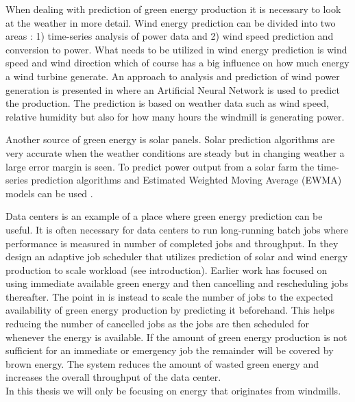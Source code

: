 When dealing with prediction of green energy production it is necessary to look at the weather in more detail. Wind energy prediction can be divided into two areas \cite{5}: 1) time-series analysis of power data and 2) wind speed prediction and conversion to power. What needs to be utilized in wind energy prediction is wind speed and wind direction which of course has a big influence on how much energy a wind turbine generate. An approach to analysis and prediction of wind power generation is presented in \cite{WindPowerGenerationUsingANN} where an Artificial Neural Network is used to predict the production. The prediction is based on weather data such as wind speed, relative humidity but also for how many hours the windmill is generating power.

Another source of green energy is solar panels. Solar
prediction algorithms are very accurate when the weather conditions are steady but in changing weather a large error margin is seen. To predict power output from a solar farm the time-series prediction algorithms and Estimated Weighted Moving Average (EWMA) models can be used \cite{5}.

Data centers is an example of a place where green energy prediction can be useful. It is often necessary for data centers to run long-running batch jobs where performance is measured in number of completed jobs and throughput. In \cite{5} they design an adaptive job scheduler that utilizes prediction of solar and wind energy production to scale workload (see introduction). Earlier work has focused on using immediate available green energy and then cancelling and rescheduling jobs thereafter. The point in \cite{5} is instead to scale the number of jobs to the expected availability of green energy production by predicting it beforehand. This helps reducing the number of cancelled jobs as the jobs are then scheduled for whenever the energy is available. If the amount of green energy production is not sufficient for an immediate or emergency job the remainder will be covered by brown energy. The system reduces the amount of wasted green energy and increases the overall throughput of the data center.
\\[0.5cm]
In this thesis we will only be focusing on energy that originates from windmills.